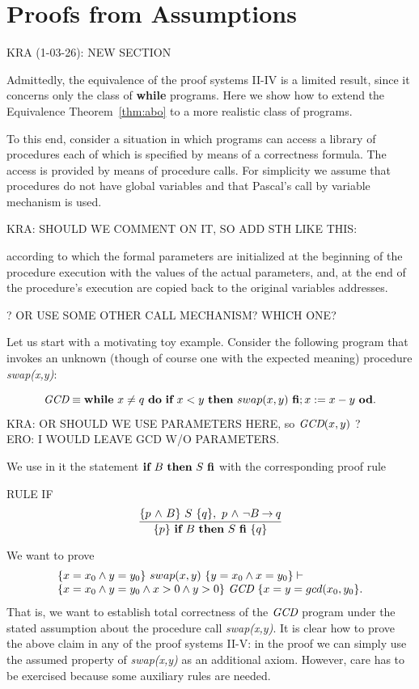 \documentclass[manuscript, screen, review]{acmart}
\begin{document}
\section{Proofs from Assumptions}

KRA (1-03-26): NEW SECTION
\III

Admittedly, the equivalence of the proof systems II-IV is a limited
result, since it concerns only the class of \textbf{while}
programs. Here we show how to extend the Equivalence
Theorem~\ref{thm:abo} to a more realistic class of programs.

To this end, consider a situation in which programs can access a library of
procedures each of which is specified by means of a correctness
formula. The access is provided by means of procedure calls.  For
simplicity we assume that procedures do not have global variables and
that Pascal's call by variable mechanism is used.

KRA: SHOULD WE COMMENT ON IT, SO ADD STH LIKE THIS: 

\NI
according to which the formal parameters are initialized at the
beginning of the procedure execution with the values of the actual
parameters, and, at the end of the  procedure's execution are
copied back to the original variables addresses.

\NI ? OR USE SOME OTHER CALL MECHANISM? WHICH ONE?

Let us start with a motivating toy example. Consider the following program
that invokes an unknown (though of course one with the expected meaning)
procedure \emph{swap(x,y)}:

\[
\mbox{{\it GCD}} \equiv \mbox{$\mbox{{\bf while}\ } {x \neq q}\ \mbox{{\bf do}\ } {\mbox{$\mbox{{\bf if}\ } {x < y} \mbox{\ {\bf then}\ } {swap(x,y)}\ \mbox{{\bf fi}}$}; x:= x-y}\ \mbox{{\bf od}}$}.
\]
KRA: OR SHOULD WE USE PARAMETERS HERE, so $\mbox{{\it GCD}}(x,y)$ ? \\
ERO: I WOULD LEAVE GCD W/O PARAMETERS.

We use in it the statement $\mbox{$\mbox{{\bf if}\ } {B} \mbox{\ {\bf then}\ } {S}\ \mbox{{\bf fi}}$}$ 
with the corresponding proof rule
\III

\NI
RULE IF
  \[ \frac{ \mbox{$\{{p \mbox{$\ \wedge\ $} B}\}\ {S}\ \{{q}\}$}, \ p \mbox{$\ \wedge\ $} \neg B \mbox{$\:\rightarrow\:$} q}
  { \mbox{$\{{p}\}\ {\mbox{$\mbox{{\bf if}\ } {B} \mbox{\ {\bf then}\ } {S}\ \mbox{{\bf fi}}$}}\ \{{q}\}$}}
  \]
\III
  
We want to prove 
\begin{equation}
 \begin{array}{l}  
\mbox{$\{{x=x_0 \wedge y=y_0}\}\ {swap(x,y)}\ \{{y=x_0 \wedge x=y_0}\}$} \vdash  \\
   \mbox{$\{{x=x_0 \wedge y=y_0 \wedge x>0 \wedge y>0}\}\ {\mbox{{\it GCD}}}\ \{{x=y=gcd(x_0, y_0}\}$}.
 \end{array}
 \label{equ:gcd}
\end{equation}
That is, we want to establish total correctness of the $\mbox{{\it GCD}}$ program
under the stated assumption about the procedure call \emph{swap(x,y)}.
It is clear how to prove the above claim in any of the proof systems
II-V: in the proof we can simply use the assumed property of
\emph{swap(x,y)} as an additional axiom. However, care has to be
exercised because some auxiliary rules are needed.
\end{document}
